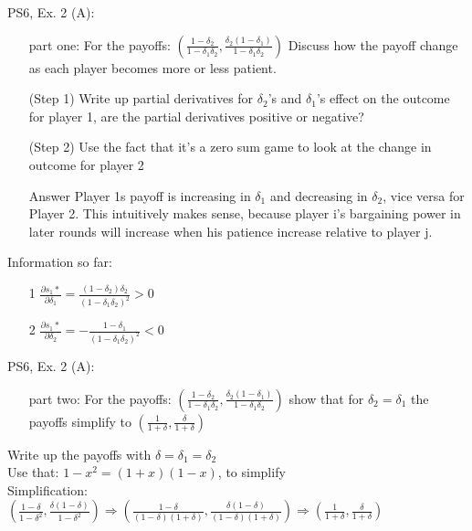 \begin{frame}{PS6, Ex. 2 (A): }
    \begin{itemize}
    \item[part one:] For the payoffs: $ \left( \frac{1-\delta_2}{1-\delta_1\delta_2},\frac{\delta_2(1-\delta_1)}{1-\delta_1\delta_2}\right)$ Discuss how the payoff change as each player becomes more or less patient.
    \end{itemize}
    \vfill\null
  \begin{multicols}{2}
    \begin{itemize}
      \item[(Step 1)] Write up partial derivatives for $\delta_2$'s and $\delta_1$'s effect on the outcome for player 1, are the partial derivatives positive or negative?
      \item[(Step 2)] Use the fact that it's a zero sum game to look at the change in outcome for player 2
      \item[Answer] Player 1s payoff is increasing in $\delta_1$ and decreasing in $\delta_2$, vice versa for Player 2. This intuitively makes sense, because player i's bargaining power in later rounds will increase when his patience increase relative to player j.
      \end{itemize}
    \vfill\null \columnbreak
    Information so far:
    \begin{itemize}
    \item[1] $\frac{\partial s_1*}{\partial \delta_1} = \frac{(1-\delta_2)\delta_2}{(1-\delta_1\delta_2)^2}>0 $\\
    \item[2] $\frac{\partial s_1*}{\partial \delta_2} = -\frac{1-\delta_1}{(1-\delta_1\delta_2)^2}<0 $\\
    \end{itemize}
    \vfill\null
  \end{multicols}
\end{frame}

\begin{frame}{PS6, Ex. 2 (A): }
    \begin{itemize}
    \item[part two:] For the payoffs: $ \left( \frac{1-\delta_2}{1-\delta_1\delta_2},\frac{\delta_2(1-\delta_1)}{1-\delta_1\delta_2}\right)$ show that for $\delta_2=\delta_1$ the payoffs simplify to $\left(\frac{1}{1+\delta},\frac{\delta}{1+\delta}\right)$
    \end{itemize}
    Write up the payoffs with $\delta=\delta_1=\delta_2$ \\
    Use that: $1-x^2=(1+x)(1-x)$, to simplify \\
    Simplification: \\
    \begin{math} \left(\frac{1-\delta}{1-\delta^2},\frac{\delta(1-\delta)}{1-\delta^2}\right) \Rightarrow \left(\frac{1-\delta}{(1-\delta)(1+\delta)},\frac{\delta(1-\delta)}{(1-\delta)(1+\delta)}\right) \Rightarrow \left(\frac{1}{1+\delta},\frac{\delta}{1+\delta}\right)
    \end{math}
    \vfill\null
\end{frame}


